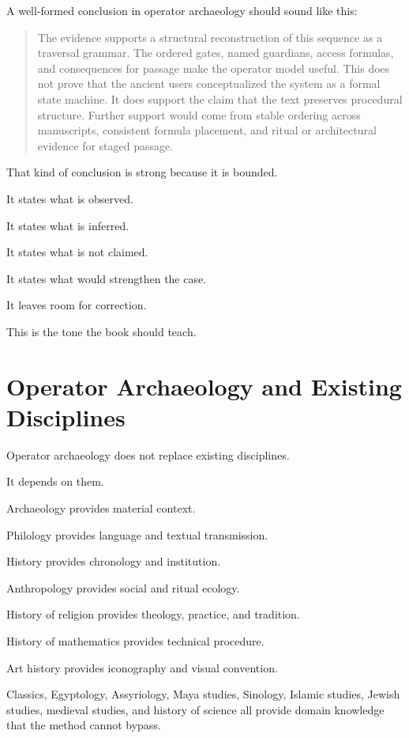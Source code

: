 \documentclass[11pt]{book}
\begin{document}
A well-formed conclusion in operator archaeology should sound like this:

\begin{quote}
The evidence supports a structural reconstruction of this sequence as a traversal grammar. The ordered gates, named guardians, access formulas, and consequences for passage make the operator model useful. This does not prove that the ancient users conceptualized the system as a formal state machine. It does support the claim that the text preserves procedural structure. Further support would come from stable ordering across manuscripts, consistent formula placement, and ritual or architectural evidence for staged passage.
\end{quote}

That kind of conclusion is strong because it is bounded.

It states what is observed.

It states what is inferred.

It states what is not claimed.

It states what would strengthen the case.

It leaves room for correction.

This is the tone the book should teach.

\section{Operator Archaeology and Existing Disciplines}

Operator archaeology does not replace existing disciplines.

It depends on them.

Archaeology provides material context.

Philology provides language and textual transmission.

History provides chronology and institution.

Anthropology provides social and ritual ecology.

History of religion provides theology, practice, and tradition.

History of mathematics provides technical procedure.

Art history provides iconography and visual convention.

Classics, Egyptology, Assyriology, Maya studies, Sinology, Islamic studies, Jewish studies, medieval studies, and history of science all provide domain knowledge that the method cannot bypass.
\end{document}

